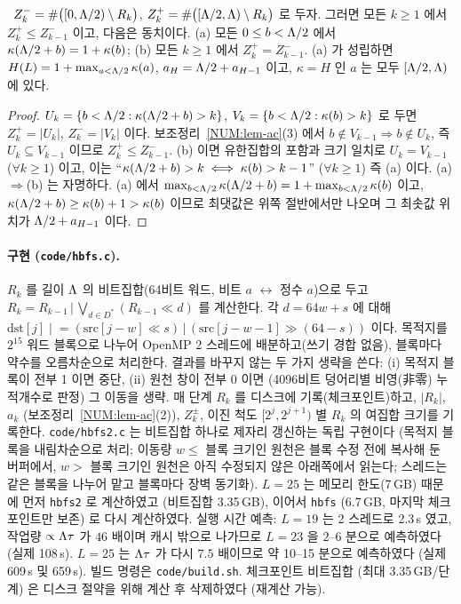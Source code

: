 \begin{lemma}[이동 항등식의 계수 판정]\label{NUM:lem-shift}
\PROVED\ $Z^-_k=\#\bigl([0,\Lambda/2)\setminus R_k\bigr)$, $Z^+_k=\#\bigl([\Lambda/2,\Lambda)\setminus R_k\bigr)$ 로 두자.
그러면 모든 $k\ge1$ 에서 $Z^+_k\le Z^-_{k-1}$ 이고, 다음은 동치이다.
(a) 모든 $0\le b<\Lambda/2$ 에서 $\kappa(\Lambda/2+b)=1+\kappa(b)$;
(b) 모든 $k\ge1$ 에서 $Z^+_k=Z^-_{k-1}$.
(a) 가 성립하면 $H(L)=1+\max_{a<\Lambda/2}\kappa(a)$, $a_{H}=\Lambda/2+a_{H-1}$ 이고, $\kappa=H$ 인 $a$ 는 모두 $[\Lambda/2,\Lambda)$ 에 있다.
\end{lemma}
\begin{proof}
$U_k=\{b<\Lambda/2:\kappa(\Lambda/2+b)>k\}$, $V_{k}=\{b<\Lambda/2:\kappa(b)>k\}$ 로 두면 $Z^+_k=|U_k|$, $Z^-_k=|V_k|$ 이다.
보조정리~\ref{NUM:lem-ac}(3) 에서 $b\notin V_{k-1}\Rightarrow b\notin U_k$, 즉 $U_k\subseteq V_{k-1}$ 이므로
$Z^+_k\le Z^-_{k-1}$. (b) 이면 유한집합의 포함과 크기 일치로 $U_k=V_{k-1}$ ($\forall k\ge1$) 이고, 이는
``$\kappa(\Lambda/2+b)>k\iff\kappa(b)>k-1$'' ($\forall k\ge 1$) 즉 (a) 이다. (a)$\Rightarrow$(b) 는 자명하다.
(a) 에서 $\max_{b<\Lambda/2}\kappa(\Lambda/2+b)=1+\max_{b<\Lambda/2}\kappa(b)$ 이고, $\kappa(\Lambda/2+b)\ge\kappa(b)+1>\kappa(b)$ 이므로
최댓값은 위쪽 절반에서만 나오며 그 최솟값 위치가 $\Lambda/2+a_{H-1}$ 이다.
\end{proof}

\paragraph{구현 (\texttt{code/hbfs.c}).}
$R_k$ 를 길이 $\Lambda$ 의 비트집합(64비트 워드, 비트 $a$ $\leftrightarrow$ 정수 $a$)으로 두고
$R_k=R_{k-1}\,\big|\,\bigvee_{d\in D^*}(R_{k-1}\ll d)$ 를 계산한다. 각 $d=64w+s$ 에 대해
$\mathrm{dst}[j]\mathrel{|}=(\mathrm{src}[j-w]\ll s)\,|\,(\mathrm{src}[j-w-1]\gg(64-s))$ 이다.
목적지를 $2^{15}$ 워드 블록으로 나누어 OpenMP 2 스레드에 배분하고(쓰기 경합 없음), 블록마다 약수를 오름차순으로 처리한다.
결과를 바꾸지 않는 두 가지 생략을 쓴다: (i) 목적지 블록이 전부 1 이면 중단,
(ii) 원천 창이 전부 0 이면 (4096비트 덩어리별 비영(非零) 누적개수로 판정) 그 이동을 생략.
매 단계 $R_k$ 를 디스크에 기록(체크포인트)하고, $|R_k|$, $a_k$ (보조정리~\ref{NUM:lem-ac}(2)), $Z^\pm_k$,
이진 척도 $[2^j,2^{j+1})$ 별 $R_k$ 의 여집합 크기를 기록한다.
\texttt{code/hbfs2.c} 는 비트집합 하나로 제자리 갱신하는 독립 구현이다
(목적지 블록을 내림차순으로 처리; 이동량 $w\le$ 블록 크기인 원천은 블록 수정 전에 복사해 둔 버퍼에서,
$w>$ 블록 크기인 원천은 아직 수정되지 않은 아래쪽에서 읽는다; 스레드는 같은 블록을 나누어 맡고 블록마다 장벽 동기화).
$L=25$ 는 메모리 한도(7\,GB) 때문에 먼저 \texttt{hbfs2} 로 계산하였고 (비트집합 3.35\,GB), 이어서 \texttt{hbfs} (6.7\,GB, 마지막 체크포인트만 보존) 로 다시 계산하였다.
실행 시간 예측: $L=19$ 는 2 스레드로 2.3\,s 였고, 작업량 $\propto\Lambda\tau$ 가 $46$ 배이며 캐시 밖으로 나가므로 $L=23$ 을 $2$--$6$ 분으로 예측하였다 (실제 108\,s).
$L=25$ 는 $\Lambda\tau$ 가 다시 $7.5$ 배이므로 약 10--15 분으로 예측하였다 (실제 609\,s 및 659\,s).
빌드 명령은 \texttt{code/build.sh}. 체크포인트 비트집합 (최대 3.35\,GB/단계) 은 디스크 절약을 위해 계산 후 삭제하였다 (재계산 가능).

